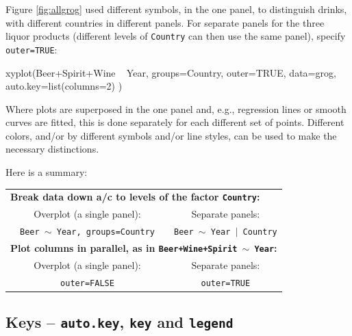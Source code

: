 \documentclass{tufte-book}\usepackage[]{graphicx}\usepackage[]{color}
\newcommand{\txtt}[1]{\texttt{#1}}
\begin{document}
Figure \ref{fig:allgrog} used different symbols, in the one panel, to
distinguish drinks, with different countries in different panels.
For separate panels for the three liquor products (different levels
of \txtt{Country} can then use the same panel), specify \txtt{outer=TRUE}:
\begin{Schunk}
\begin{Sinput}
xyplot(Beer+Spirit+Wine ~ Year,
       groups=Country, outer=TRUE,
       data=grog, auto.key=list(columns=2) )
\end{Sinput}
\end{Schunk}

Where plots are superposed in the one panel and, e.g., regression
lines or smooth curves are fitted, this is done separately for each
different set of points.  Different colors, and/or by different
symbols and/or line styles, can be used to make the necessary
distinctions.

Here is a summary:
\vspace*{9pt}

\begin{fullwidth}
\begin{tabular}{lccc}
\multicolumn{4}{l}{\bf Break data down a/c to levels of the
factor \texttt{Country}:}\\[3pt]
& Overplot (a single panel): & & Separate panels: \\
& \texttt{Beer $\sim$ Year, groups=Country} & &
\texttt{Beer $\sim$ Year $\mid$ Country}\\[12pt]
\multicolumn{4}{l}{\bf Plot columns in parallel, as in
\texttt{Beer+Wine+Spirit $\sim$ Year}:}\\[3pt]
& Overplot (a single panel): & & Separate panels: \\
& \texttt{outer=FALSE} & & \texttt{outer=TRUE}\\
\end{tabular}
\end{fullwidth}

\subsection{Keys -- \texttt{auto.key}, \texttt{key} and \texttt{legend}}\label{sec:keys}
\end{document}
